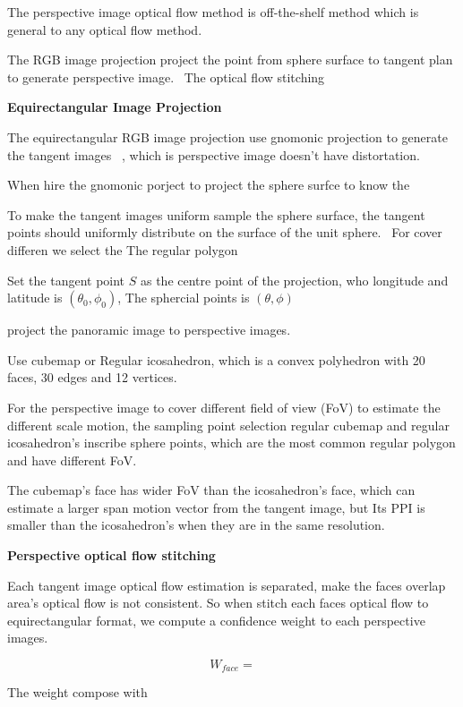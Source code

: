  The perspective image optical flow method is off-the-shelf method which is general to any optical flow method.

The RGB image projection project the point from sphere surface to tangent plan to generate perspective image.~\cite{??}
The optical flow stitching 

\textbf{Equirectangular Image Projection}


The equirectangular RGB image projection use gnomonic projection to generate the tangent images ~\cite{??}, which is perspective image doesn't have distortation.

When hire the gnomonic porject to project the sphere surfce to know the 

To make the tangent images uniform sample the sphere surface, the tangent points should uniformly distribute on the surface of the unit sphere.~\cite{??}
For cover differen we select the 
The regular polygon ~\cite{??} 


Set the tangent point $S$ as the centre point of the projection, who longitude and latitude is $(\theta_0, \phi_0)$,
The sphercial points is $(\theta, \phi)$

project the panoramic image to perspective images.

Use cubemap or Regular icosahedron, which is a convex polyhedron with 20 faces, 30 edges and 12 vertices.

For the perspective image to cover different field of view (FoV)  to estimate the different scale motion, the sampling point selection regular cubemap and regular icosahedron's inscribe sphere points, which are the most common regular polygon and have different FoV. ~\cite{xxx}

The cubemap's face has wider FoV than the icosahedron's face, which can estimate a larger span motion vector from the tangent image, but Its PPI is smaller than the icosahedron's when they are in the same resolution.


\textbf{Perspective optical flow stitching}

Each tangent image optical flow estimation is separated, make the faces overlap area's optical flow is not consistent.
So when stitch each faces optical flow to equirectangular format, we compute a confidence weight to each perspective images. 

\begin{equation}
W_{face} =
\end{equation}


The weight compose with 


